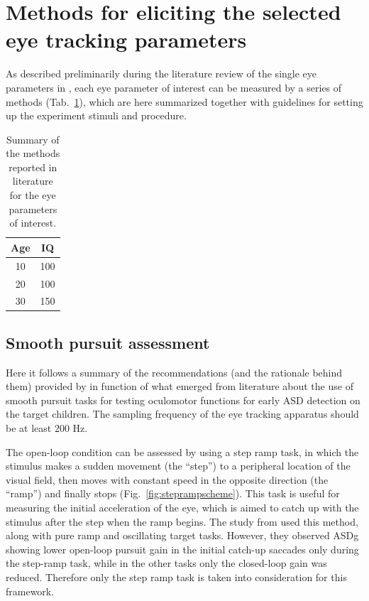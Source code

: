 \section{Methods for eliciting the selected eye tracking parameters}
\label{sec:fwkmethods}

As described preliminarily during the literature review of the single eye parameters in , each eye parameter of interest can be measured by a series of methods (Tab.~\ref{tab:methodsliterature}), which are here summarized together with guidelines for setting up the experiment stimuli and procedure.

\begin{table}[h]
  \centering
  \begin{tabular}{c|c}
    Age  & IQ  \\ 
    \hline
    10   & 100 \\
    20   & 100 \\
    30   & 150
  \end{tabular}
  \caption{Summary of the methods reported in literature for the eye parameters of interest.}
  \label{tab:methodsliterature}
\end{table}



\subsection{Smooth pursuit assessment}
\label{sec:fwksmoothpursuit}

Here it follows a summary of the recommendations (and the rationale behind them) provided by \cite{smyrnis2008guidelines} in function of what emerged from literature about the use of smooth pursuit tasks for testing oculomotor functions for early ASD detection on the target children.
The sampling frequency of the eye tracking apparatus should be at least 200 Hz.

The open-loop condition can be assessed by using a step ramp task, in which the stimulus makes a sudden movement (the “step”) to a peripheral location of the visual field, then moves with constant speed in the opposite direction (the “ramp”) and finally stops (Fig.~\ref{fig:steprampscheme}). This task is useful for measuring the initial acceleration of the eye, which is aimed to catch up with the stimulus after the step when the ramp begins. The study from \cite{takarae2004smoothpursuit} used this method, along with pure ramp and oscillating target tasks. However, they observed ASDg showing lower open-loop pursuit gain in the initial catch-up saccades only during the step-ramp task, while in the other tasks only the closed-loop gain was reduced. Therefore only the step ramp task is taken into consideration for this framework.

